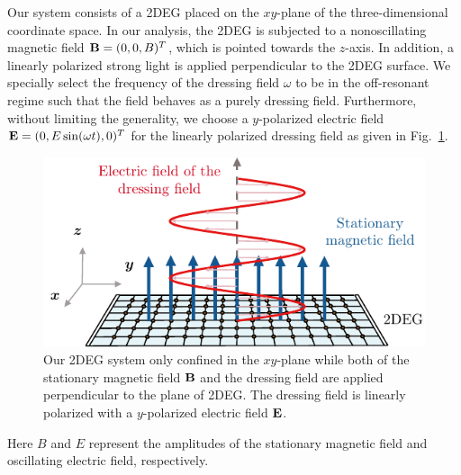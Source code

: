 
Our system consists of a 2DEG placed on the $xy$-plane of the three-dimensional coordinate space. In our analysis, the 2DEG is subjected to a nonoscillating magnetic field $\vb{B} = (0,0,B)^{T}$, which is pointed towards the $z$-axis. In addition, a linearly polarized strong light is applied perpendicular to the 2DEG surface. We specially select the frequency of the dressing field $\omega$ to be in the off-resonant regime such that the field behaves as a purely dressing field. Furthermore, without limiting the generality, we choose a $y$-polarized electric field $\vb{E} = (0,E\sin(\omega t),0)^{T}$ for the linearly polarized dressing field as given in Fig.~\ref{fig:1}.
\begin{figure}[b]
\includegraphics[scale=0.9]{figures/fig_1.pdf}
\caption{\label{fig:1} Our 2DEG system only confined in the $xy$-plane while both of the stationary magnetic field $\vb{B}$ and the dressing field are applied perpendicular to the plane of 2DEG. The dressing field is linearly polarized with a $y$-polarized electric field $\vb{E}$.}
\end{figure}
Here $B$ and $E$ represent the amplitudes of the stationary magnetic field and oscillating electric field, respectively.

